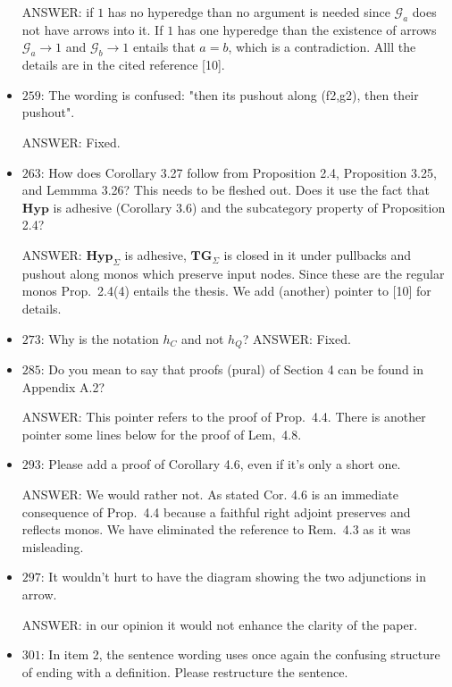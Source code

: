 \documentclass[english,11pt,a4paper]{article}
\begin{document}
\begin{itemize}
ANSWER: if $1$ has no hyperedge than no argument is needed since $\mathcal{G}_a$ does not have arrows into it. If $1$ has one hyperedge than the existence of arrows $\mathcal{G}_a\to 1$ and $\mathcal{G}_b\to 1$ entails that $a=b$, which is a contradiction. Alll the details are in the cited reference [10].

\item $259$: The wording is confused: "then its pushout along (f2,g2), then their pushout".

ANSWER: Fixed.

\item $263$: How does Corollary 3.27 follow from Proposition 2.4, Proposition 3.25, and Lemmma 3.26? This needs to be fleshed out. Does it use the fact that $\mathbf{Hyp}$ is adhesive (Corollary 3.6) and the subcategory property of Proposition 2.4?

ANSWER: $\mathbf{Hyp}_\Sigma$ is adhesive, $\mathbf{TG}_\Sigma$ is closed in it under pullbacks and pushout along monos which preserve input nodes. Since these are the regular monos Prop.~2.4(4) entails the thesis. We add (another) pointer to [10] for details.


\item $273$: Why is the notation $h_C$ and not $h_Q$?
ANSWER: Fixed.

\item $285$: Do you mean to say that proofs (pural) of Section 4 can be found in Appendix A.2?

ANSWER: This pointer refers to the proof of Prop.~4.4. There is another pointer some lines below for the proof of Lem,~4.8.

\item $293$: Please add a proof of Corollary 4.6, even if it's only a short one.

ANSWER: We would rather not. As stated Cor. 4.6 is an immediate consequence of Prop.~4.4 because a faithful right adjoint preserves and reflects monos. We have eliminated the reference to Rem.~4.3 as it was misleading.


\item $297$: It wouldn't hurt to have the diagram showing the two adjunctions in arrow.

ANSWER: in our opinion it would not enhance the clarity of the paper.

\item $301$: In item 2, the sentence wording uses once again the confusing structure of ending with a definition. Please restructure the sentence.


\end{itemize}
\end{document}
